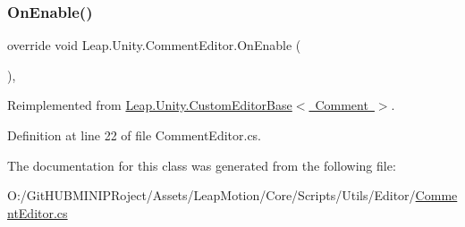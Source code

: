 \subsubsection{\texorpdfstring{OnEnable()}{OnEnable()}}
{\footnotesize\ttfamily override void Leap.\+Unity.\+Comment\+Editor.\+On\+Enable (\begin{DoxyParamCaption}{ }\end{DoxyParamCaption})\hspace{0.3cm}{\ttfamily [protected]}, {\ttfamily [virtual]}}



Reimplemented from \mbox{\hyperlink{class_leap_1_1_unity_1_1_custom_editor_base_a2268bc01655342bd3da5ae015bfa2f93}{Leap.\+Unity.\+Custom\+Editor\+Base$<$ Comment $>$}}.



Definition at line 22 of file Comment\+Editor.\+cs.



The documentation for this class was generated from the following file\+:\begin{DoxyCompactItemize}
\item 
O\+:/\+Git\+H\+U\+B\+M\+I\+N\+I\+P\+Roject/\+Assets/\+Leap\+Motion/\+Core/\+Scripts/\+Utils/\+Editor/\mbox{\hyperlink{_comment_editor_8cs}{Comment\+Editor.\+cs}}\end{DoxyCompactItemize}
